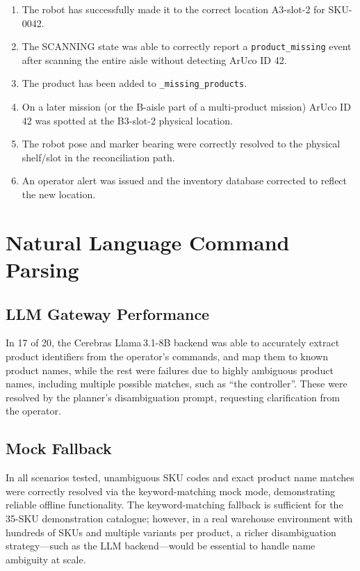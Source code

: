 \documentclass[12pt,a4paper]{report}
\begin{document}
\begin{enumerate}
    \item The robot has successfully made it to the correct location A3-slot-2 for SKU-0042.
    \item The SCANNING state was able to correctly report a \texttt{product\_missing} event after scanning the entire aisle without detecting ArUco ID 42.
    \item The product has been added to \texttt{\_missing\_products}.
    \item On a later mission (or the B-aisle part of a multi-product mission) ArUco ID 42 was spotted at the B3-slot-2 physical location.
    \item The robot pose and marker bearing were correctly resolved to the physical shelf/slot in the reconciliation path.
    \item An operator alert was issued and the inventory database corrected to reflect the new location.
\end{enumerate}

\section{Natural Language Command Parsing}

\subsection{LLM Gateway Performance}

In 17 of 20, the Cerebras Llama\,3.1-8B backend was able to accurately extract product identifiers from the operator's commands, and map them to known product names, while the rest were failures due to highly ambiguous product names, including multiple possible matches, such as ``the controller''. These were resolved by the planner's disambiguation prompt, requesting clarification from the operator.

\subsection{Mock Fallback}

In all scenarios tested, unambiguous SKU codes and exact product name matches were correctly resolved via the keyword-matching mock mode, demonstrating reliable offline functionality. The keyword-matching fallback is sufficient for the 35-SKU demonstration catalogue; however, in a real warehouse environment with hundreds of SKUs and multiple variants per product, a richer disambiguation strategy—such as the LLM backend—would be essential to handle name ambiguity at scale.
\end{document}
